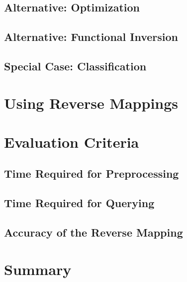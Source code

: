\subsection{Alternative: Optimization}

\subsection{Alternative: Functional Inversion}

\subsection{Special Case: Classification}


\section{Using Reverse Mappings}




\section{Evaluation Criteria}

\subsection{Time Required for Preprocessing}

\subsection{Time Required for Querying}

\subsection{Accuracy of the Reverse Mapping}


\section{Summary}




